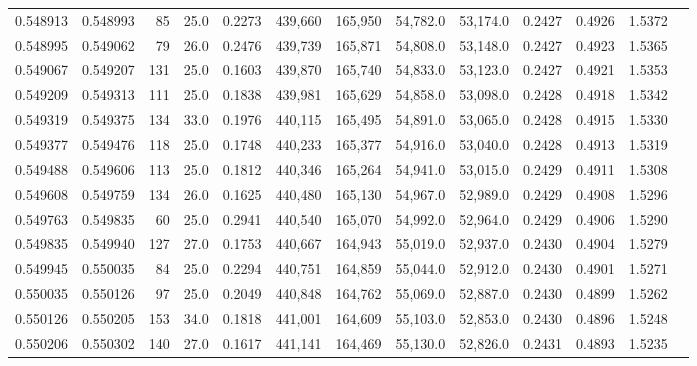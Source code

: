 \begin{tabular}{rrrrrrrrrrrrr}
0.548913 & 0.548993 &    85 & 25.0 &                                     0.2273 & 439,660 & 165,950 &  54,782.0 &  53,174.0 & 0.2427 & 0.4926 & 1.5372 \\
0.548995 & 0.549062 &    79 & 26.0 &                                     0.2476 & 439,739 & 165,871 &  54,808.0 &  53,148.0 & 0.2427 & 0.4923 & 1.5365 \\
0.549067 & 0.549207 &   131 & 25.0 &                                     0.1603 & 439,870 & 165,740 &  54,833.0 &  53,123.0 & 0.2427 & 0.4921 & 1.5353 \\
0.549209 & 0.549313 &   111 & 25.0 &                                     0.1838 & 439,981 & 165,629 &  54,858.0 &  53,098.0 & 0.2428 & 0.4918 & 1.5342 \\
0.549319 & 0.549375 &   134 & 33.0 &                                     0.1976 & 440,115 & 165,495 &  54,891.0 &  53,065.0 & 0.2428 & 0.4915 & 1.5330 \\
0.549377 & 0.549476 &   118 & 25.0 &                                     0.1748 & 440,233 & 165,377 &  54,916.0 &  53,040.0 & 0.2428 & 0.4913 & 1.5319 \\
0.549488 & 0.549606 &   113 & 25.0 &                                     0.1812 & 440,346 & 165,264 &  54,941.0 &  53,015.0 & 0.2429 & 0.4911 & 1.5308 \\
0.549608 & 0.549759 &   134 & 26.0 &                                     0.1625 & 440,480 & 165,130 &  54,967.0 &  52,989.0 & 0.2429 & 0.4908 & 1.5296 \\
0.549763 & 0.549835 &    60 & 25.0 &                                     0.2941 & 440,540 & 165,070 &  54,992.0 &  52,964.0 & 0.2429 & 0.4906 & 1.5290 \\
0.549835 & 0.549940 &   127 & 27.0 &                                     0.1753 & 440,667 & 164,943 &  55,019.0 &  52,937.0 & 0.2430 & 0.4904 & 1.5279 \\
0.549945 & 0.550035 &    84 & 25.0 &                                     0.2294 & 440,751 & 164,859 &  55,044.0 &  52,912.0 & 0.2430 & 0.4901 & 1.5271 \\
0.550035 & 0.550126 &    97 & 25.0 &                                     0.2049 & 440,848 & 164,762 &  55,069.0 &  52,887.0 & 0.2430 & 0.4899 & 1.5262 \\
0.550126 & 0.550205 &   153 & 34.0 &                                     0.1818 & 441,001 & 164,609 &  55,103.0 &  52,853.0 & 0.2430 & 0.4896 & 1.5248 \\
0.550206 & 0.550302 &   140 & 27.0 &                                     0.1617 & 441,141 & 164,469 &  55,130.0 &  52,826.0 & 0.2431 & 0.4893 & 1.5235 \\

\end{tabular}
